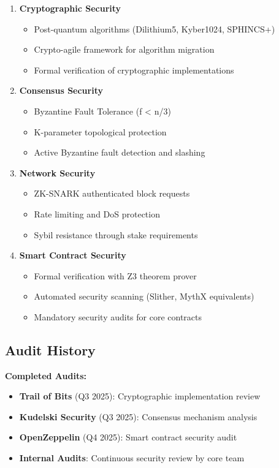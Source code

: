 \documentclass[11pt,a4paper]{scrartcl}
\begin{document}
\begin{enumerate}
\item \textbf{Cryptographic Security}
   \begin{itemize}
   \item Post-quantum algorithms (Dilithium5, Kyber1024, SPHINCS+)
   \item Crypto-agile framework for algorithm migration
   \item Formal verification of cryptographic implementations
   \end{itemize}

\item \textbf{Consensus Security}
   \begin{itemize}
   \item Byzantine Fault Tolerance (f < n/3)
   \item K-parameter topological protection
   \item Active Byzantine fault detection and slashing
   \end{itemize}

\item \textbf{Network Security}
   \begin{itemize}
   \item ZK-SNARK authenticated block requests
   \item Rate limiting and DoS protection
   \item Sybil resistance through stake requirements
   \end{itemize}

\item \textbf{Smart Contract Security}
   \begin{itemize}
   \item Formal verification with Z3 theorem prover
   \item Automated security scanning (Slither, MythX equivalents)
   \item Mandatory security audits for core contracts
   \end{itemize}
\end{enumerate}

\subsection{Audit History}

\textbf{Completed Audits:}
\begin{itemize}
\item \textbf{Trail of Bits} (Q3 2025): Cryptographic implementation review
\item \textbf{Kudelski Security} (Q3 2025): Consensus mechanism analysis
\item \textbf{OpenZeppelin} (Q4 2025): Smart contract security audit
\item \textbf{Internal Audits}: Continuous security review by core team
\end{itemize}
\end{document}
